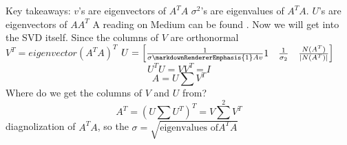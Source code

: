 Key takeaways:\markdownRendererInterblockSeparator
{}\markdownRendererUlBegin
\markdownRendererUlItem $v$'s are eigenvectors of $A^TA$\markdownRendererUlItemEnd 
\markdownRendererUlItem $\sigma^2$'s are eigenvalues of $A^TA$.\markdownRendererUlItemEnd 
\markdownRendererUlItem \markdownRendererUlItemEnd 
\markdownRendererUlItem $U$'s are eigenvectors of $AA^T$\markdownRendererUlItemEnd 
\markdownRendererUlEnd \markdownRendererInterblockSeparator
{}A reading on Medium can be found . Now we will get into the SVD itself. Since the columns of $V$ are orthonormal\markdownRendererEllipsis{}\markdownRendererInterblockSeparator
{}\markdownRendererUlBegin
\markdownRendererUlItem $V^T = eigenvector(A^TA)^T$\markdownRendererUlItemEnd 
\markdownRendererUlItem $U = \begin{bmatrix}\frac{1}{\sigma\markdownRendererEmphasis{1}Av}1 & \frac{1}{\sigma_2} & \frac{N(A^T)}{|N(A^T)|}\end{bmatrix}$\markdownRendererUlItemEnd 
\markdownRendererUlEnd \markdownRendererInterblockSeparator
{}$$U^TU=VV^T=I$$\markdownRendererInterblockSeparator
{}$$A = U\sum V^T$$\markdownRendererInterblockSeparator
{}Where do we get the columns of $V$ and $U$ from?\markdownRendererInterblockSeparator
{}$$A^T = (U\sum U^T)^T=V\sum^2 V^T$$\markdownRendererInterblockSeparator
{}diagnolization of $A^TA$, so the $\sigma=\sqrt{\text{eigenvalues of}A^TA}$\relax